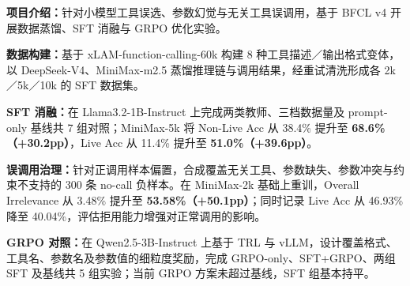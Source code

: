 
\textbf{项目介绍：}针对小模型工具误选、参数幻觉与无关工具误调用，基于 BFCL v4 开展数据蒸馏、SFT 消融与 GRPO 优化实验。\par
\begin{experienceitems}
  \item \textbf{数据构建：}基于 xLAM-function-calling-60k 构建 8 种工具描述／输出格式变体，以 DeepSeek-V4、MiniMax-m2.5 蒸馏推理链与调用结果，经重试清洗形成各 2k／5k／10k 的 SFT 数据集。
  \item \textbf{SFT 消融：}在 Llama3.2-1B-Instruct 上完成两类教师、三档数据量及 prompt-only 基线共 7 组对照；MiniMax-5k 将 Non-Live Acc 从 38.4\% 提升至 \textbf{68.6\%（+30.2pp）}，Live Acc 从 11.4\% 提升至 \textbf{51.0\%（+39.6pp）}。
  \item \textbf{误调用治理：}针对正调用样本偏置，合成覆盖无关工具、参数缺失、参数冲突与约束不支持的 300 条 no-call 负样本。在 MiniMax-2k 基础上重训，Overall Irrelevance 从 3.48\% 提升至 \textbf{53.58\%（+50.1pp）}；同时记录 Live Acc 从 46.93\% 降至 40.04\%，评估拒用能力增强对正常调用的影响。
  \item \textbf{GRPO 对照：}在 Qwen2.5-3B-Instruct 上基于 TRL 与 vLLM，设计覆盖格式、工具名、参数名及参数值的细粒度奖励，完成 GRPO-only、SFT+GRPO、两组 SFT 及基线共 5 组实验；当前 GRPO 方案未超过基线，SFT 组基本持平。
\end{experienceitems}
